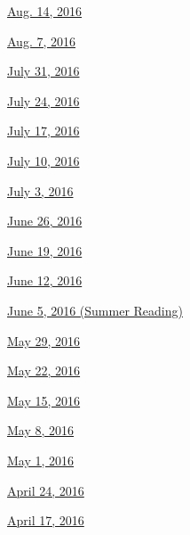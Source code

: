 \href{http://www.nytimes3xbfgragh.onion/indexes/2016/08/14/todayspaper/index.html\#bookreview}{Aug.
14, 2016}

\href{http://www.nytimes3xbfgragh.onion/indexes/2016/08/07/todayspaper/index.html\#bookreview}{Aug.
7, 2016}

\href{http://www.nytimes3xbfgragh.onion/indexes/2016/07/31/todayspaper/index.html\#bookreview}{July
31, 2016}

\href{http://www.nytimes3xbfgragh.onion/indexes/2016/07/24/todayspaper/index.html\#bookreview}{July
24, 2016}

\href{http://www.nytimes3xbfgragh.onion/indexes/2016/07/17/todayspaper/index.html\#bookreview}{July
17, 2016}

\href{http://www.nytimes3xbfgragh.onion/indexes/2016/07/10/todayspaper/index.html\#bookreview}{July
10, 2016}

\href{http://www.nytimes3xbfgragh.onion/indexes/2016/07/03/todayspaper/index.html\#bookreview}{July
3, 2016}

\href{http://www.nytimes3xbfgragh.onion/indexes/2016/06/26/todayspaper/index.html\#bookreview}{June
26, 2016}

\href{http://www.nytimes3xbfgragh.onion/indexes/2016/06/19/todayspaper/index.html\#bookreview}{June
19, 2016}

\href{http://www.nytimes3xbfgragh.onion/indexes/2016/06/12/todayspaper/index.html\#bookreview}{June
12, 2016}

\href{http://www.nytimes3xbfgragh.onion/indexes/2016/06/05/todayspaper/index.html\#bookreview}{June
5, 2016 (Summer Reading)}

\href{http://www.nytimes3xbfgragh.onion/indexes/2016/05/29/todayspaper/index.html\#bookreview}{May
29, 2016}

\href{http://www.nytimes3xbfgragh.onion/indexes/2016/05/22/todayspaper/index.html\#bookreview}{May
22, 2016}

\href{http://www.nytimes3xbfgragh.onion/indexes/2016/05/15/todayspaper/index.html\#bookreview}{May
15, 2016}

\href{http://www.nytimes3xbfgragh.onion/indexes/2016/05/08/todayspaper/index.html\#bookreview}{May
8, 2016}

\href{http://www.nytimes3xbfgragh.onion/indexes/2016/05/01/todayspaper/index.html\#bookreview}{May
1, 2016}

\href{http://www.nytimes3xbfgragh.onion/indexes/2016/04/24/todayspaper/index.html\#bookreview}{April
24, 2016}

\href{http://www.nytimes3xbfgragh.onion/indexes/2016/04/17/todayspaper/index.html\#bookreview}{April
17, 2016}

